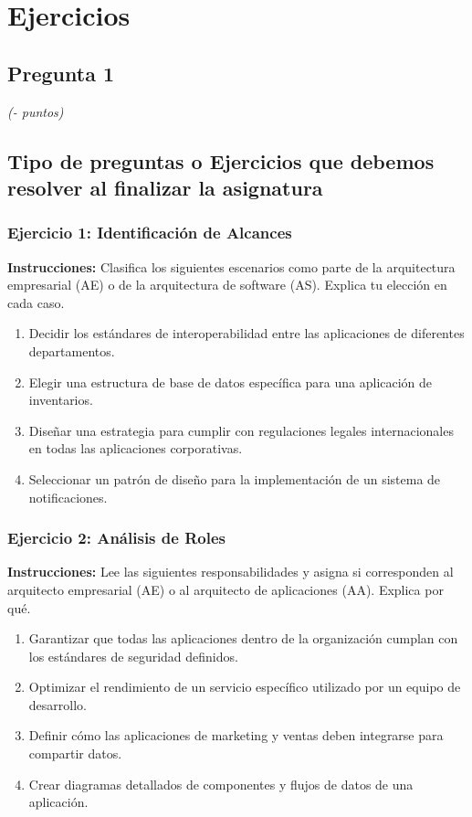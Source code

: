 \chapter{Ejercicios}

\section*{Pregunta 1}

\begin{flushright}
   \textit{(- puntos)}
\end{flushright}


\section{Tipo de preguntas o Ejercicios que debemos resolver al finalizar la asignatura} 
\subsection{Ejercicio 1: Identificación de Alcances}
\textbf{Instrucciones:} Clasifica los siguientes escenarios como parte de la arquitectura empresarial (AE) o de la arquitectura de software (AS). Explica tu elección en cada caso.

\begin{enumerate}
    \item Decidir los estándares de interoperabilidad entre las aplicaciones de diferentes departamentos.
    \item Elegir una estructura de base de datos específica para una aplicación de inventarios.
    \item Diseñar una estrategia para cumplir con regulaciones legales internacionales en todas las aplicaciones corporativas.
    \item Seleccionar un patrón de diseño para la implementación de un sistema de notificaciones.
\end{enumerate}

\subsection{Ejercicio 2: Análisis de Roles}
\textbf{Instrucciones:} Lee las siguientes responsabilidades y asigna si corresponden al arquitecto empresarial (AE) o al arquitecto de aplicaciones (AA). Explica por qué.

\begin{enumerate}
    \item Garantizar que todas las aplicaciones dentro de la organización cumplan con los estándares de seguridad definidos.
    \item Optimizar el rendimiento de un servicio específico utilizado por un equipo de desarrollo.
    \item Definir cómo las aplicaciones de marketing y ventas deben integrarse para compartir datos.
    \item Crear diagramas detallados de componentes y flujos de datos de una aplicación.
\end{enumerate}

